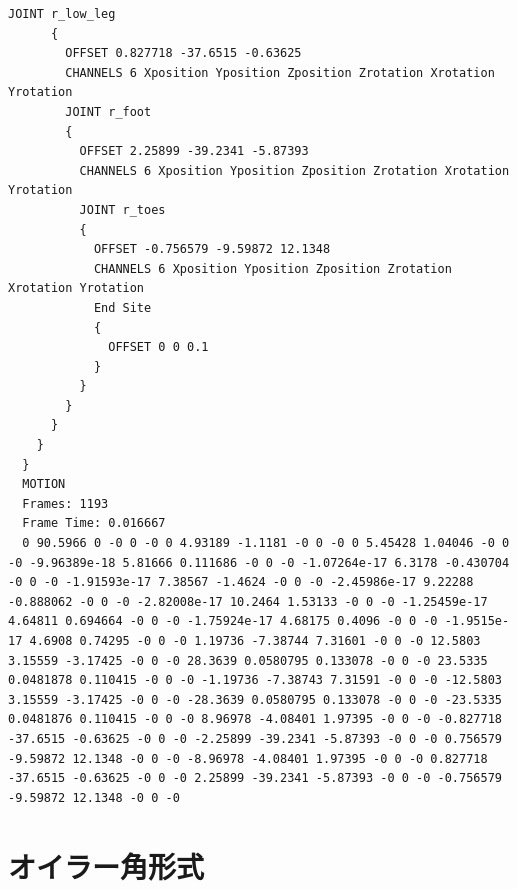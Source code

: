 \documentclass[a4j, fleqn, 12pt]{jsreport}
\begin{document}
\begin{lstlisting}[caption=mocopiのBVHファイル,label=BVH]
      JOINT r_low_leg
      {
        OFFSET 0.827718 -37.6515 -0.63625
        CHANNELS 6 Xposition Yposition Zposition Zrotation Xrotation Yrotation
        JOINT r_foot
        {
          OFFSET 2.25899 -39.2341 -5.87393
          CHANNELS 6 Xposition Yposition Zposition Zrotation Xrotation Yrotation
          JOINT r_toes
          {
            OFFSET -0.756579 -9.59872 12.1348
            CHANNELS 6 Xposition Yposition Zposition Zrotation Xrotation Yrotation
            End Site
            {
              OFFSET 0 0 0.1
            }
          }
        }
      }
    }
  }
  MOTION
  Frames: 1193
  Frame Time: 0.016667
  0 90.5966 0 -0 0 -0 0 4.93189 -1.1181 -0 0 -0 0 5.45428 1.04046 -0 0 -0 -9.96389e-18 5.81666 0.111686 -0 0 -0 -1.07264e-17 6.3178 -0.430704 -0 0 -0 -1.91593e-17 7.38567 -1.4624 -0 0 -0 -2.45986e-17 9.22288 -0.888062 -0 0 -0 -2.82008e-17 10.2464 1.53133 -0 0 -0 -1.25459e-17 4.64811 0.694664 -0 0 -0 -1.75924e-17 4.68175 0.4096 -0 0 -0 -1.9515e-17 4.6908 0.74295 -0 0 -0 1.19736 -7.38744 7.31601 -0 0 -0 12.5803 3.15559 -3.17425 -0 0 -0 28.3639 0.0580795 0.133078 -0 0 -0 23.5335 0.0481878 0.110415 -0 0 -0 -1.19736 -7.38743 7.31591 -0 0 -0 -12.5803 3.15559 -3.17425 -0 0 -0 -28.3639 0.0580795 0.133078 -0 0 -0 -23.5335 0.0481876 0.110415 -0 0 -0 8.96978 -4.08401 1.97395 -0 0 -0 -0.827718 -37.6515 -0.63625 -0 0 -0 -2.25899 -39.2341 -5.87393 -0 0 -0 0.756579 -9.59872 12.1348 -0 0 -0 -8.96978 -4.08401 1.97395 -0 0 -0 0.827718 -37.6515 -0.63625 -0 0 -0 2.25899 -39.2341 -5.87393 -0 0 -0 -0.756579 -9.59872 12.1348 -0 0 -0   
\end{lstlisting}
\chapter{オイラー角形式}\label{Euler}
\end{document}
